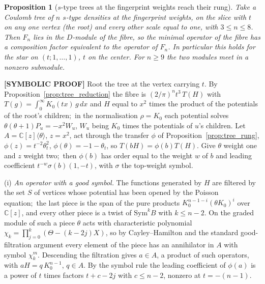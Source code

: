 \documentclass[aps,pra,twocolumn,superscriptaddress,longbibliography]{revtex4-2}
\newtheorem{proposition}{Proposition}
\begin{document}
\begin{proposition}[$s$-type trees at the fingerprint weights reach their rung]
\label{prop:star_attain}
Take a Coulomb tree of $n$ $s$-type densities at the fingerprint weights, on the
slice with $t$ on any one vertex (the root) and every other scale equal to one,
with $3\le n\le8$.  Then $F_n$ lies in the $D$-module of the fibre, so the
minimal operator of the fibre has a composition factor equivalent to the
operator of $F_n$.  In particular this holds for the star on
$(t;1,\dots,1)$, $t$ on the center.  For $n\ge9$ the two modules meet in a
nonzero submodule.
\end{proposition}

\textbf{[SYMBOLIC PROOF]} Root the tree at the vertex carrying $t$.  By
Proposition~\ref{prop:tree_reduction} the fibre is $(2/\pi)^nt^3\,T(H)$ with
$T(g)=\int_0^\infty K_0(tx)\,g\,dx$ and $H$ equal to $x^2$ times the product of
the potentials of the root's children;\ in the normalisation $\rho=K_0$ each
potential solves $\theta(\theta+1)P_u=-x^2W_u$, $W_u$ being $K_0$ times the
potentials of $u$'s children.  Let $A=\mathbb{C}[z]\langle\theta\rangle$,
$z=x^2$, act through the transfer $\phi$ of Proposition~\ref{prop:tree_rung},
$\phi(z)=t^{-2}\theta_t^2$, $\phi(\theta)=-1-\theta_t$, so $T(bH)=\phi(b)T(H)$.
Give $\theta$ weight one and $z$ weight two;\ then $\phi(b)$ has order equal to
the weight $w$ of $b$ and leading coefficient $t^{-w}\sigma(b)(1,-t)$, with
$\sigma$ the top-weight symbol.

(i) \emph{An operator with a good symbol.}  The functions generated by $H$ are
filtered by the set $S$ of vertices whose potential has been opened by the
Poisson equation;\ the last piece is the span of the pure products
$K_0^{n-1-i}(\theta K_0)^i$ over $\mathbb{C}[z]$, and every other piece is a
twist of $\mathrm{Sym}^kB$ with $k\le n-2$.  On the graded module of such a
piece $\theta$ acts with characteristic polynomial
$\chi_k=\prod_{j=0}^{k}(\Theta-(k-2j)X)$, so by Cayley--Hamilton and the
standard good-filtration argument every element of the piece has an
annihilator in $A$ with symbol $\chi_k^m$.  Descending the filtration gives
$a\in A$, a product of such operators, with $aH=q\,K_0^{n-1}$, $q\in A$.  By the
symbol rule the leading coefficient of $\phi(a)$ is a power of $t$ times
factors $t+c-2j$ with $c\le n-2$, nonzero at $t=-(n-1)$.
\end{document}
